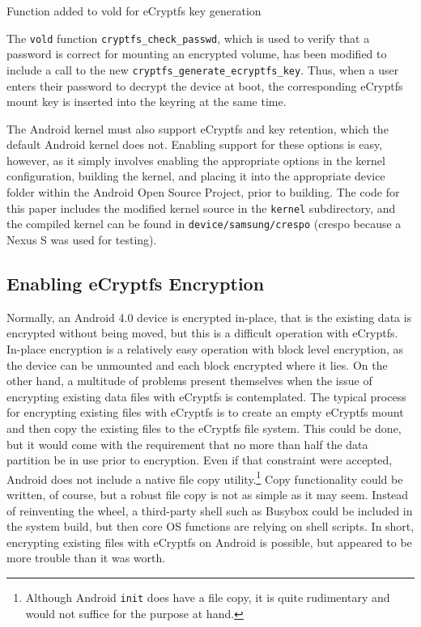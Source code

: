 \begin{table}[htb]
 
\caption{Function added to vold for eCryptfs key generation}
\label{tab:generate-key}
\end{table}

The \texttt{vold} function \texttt{cryptfs\_check\_passwd}, which is used to verify that a password is correct for mounting an
encrypted volume, has been modified to include a call to the new \texttt{cryptfs\_generate\_ecryptfs\_key}. Thus, when a user enters
their password to decrypt the device at boot, the corresponding eCryptfs mount key is inserted into the keyring at the same time.

The Android kernel must also support eCryptfs and key retention, which the default Android kernel does not. Enabling support for
these options is easy, however, as it simply involves enabling the appropriate options in the kernel configuration, building the
kernel, and placing it into the appropriate device folder within the Android Open Source Project, prior to building. The code for
this paper includes the modified kernel source in the \texttt{kernel} subdirectory, and the compiled kernel can be found in
\texttt{device/samsung/crespo} (crespo because a Nexus S was used for testing).

\subsection{Enabling eCryptfs Encryption} Normally, an Android 4.0 device is encrypted in-place, that is the existing data is
encrypted without being moved, but this is a difficult operation with eCryptfs. In-place encryption is a relatively easy operation
with block level encryption, as the device can be unmounted and each block encrypted where it lies. On the other hand, a multitude
of problems present themselves when the issue of encrypting existing data files with eCryptfs is contemplated.  The typical process
for encrypting existing files with eCryptfs is to create an empty eCryptfs mount and then copy the existing files to the eCryptfs
file system.  This could be done, but it would come with the requirement that no more than half the data partition be in use prior to
encryption. Even if that constraint were accepted, Android does not include a native file copy utility.\footnote{Although Android
\texttt{init} does have a file copy, it is quite rudimentary and would not suffice for the purpose at hand.} Copy functionality
could be written, of course, but a robust file copy is not as simple as it may seem. Instead of reinventing the wheel, a third-party
shell such as Busybox could be included in the system build, but then core OS functions are relying on shell scripts. In short,
encrypting existing files with eCryptfs on Android is possible, but appeared to be more trouble than it was worth.


